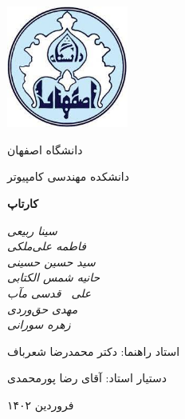 \documentclass[12pt, oneside]{book}
\begin{document}
    \begin{titlepage}
    	\centering
    	\includegraphics[width=4cm, height=4cm]{./images/logo}\par
        \vspace{2mm}
    	دانشگاه اصفهان \par
        دانشکده مهندسی کامپیوتر \par

    	\vspace{1cm}
    	{\huge \textbf{کارتاپ}\par}
    	\vspace{3cm}
    	{\small\itshape
        سینا ربیعی \\
    	فاطمه علی‌ملکی \\
    	سید حسین حسینی \\
    	حانیه شمس الکتابی \\
    	علی 
    	$\ $
    	قدسی مآب \\
    	مهدی حق‌وردی \\
    	زهره سورانی \par}

    	\vfill
        استاد راهنما:‌ دکتر محمدرضا شعرباف \par
        دستیار استاد:‌ آقای رضا پورمحمدی
    	\vfill

    	{\large فروردین ۱۴۰۲\par}
    \end{titlepage}
\end{document}
